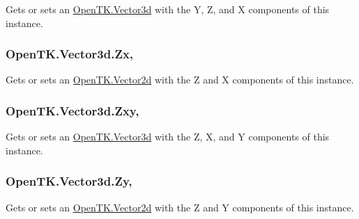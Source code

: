 Gets or sets an \hyperlink{struct_open_t_k_1_1_vector3d}{Open\-T\-K.\-Vector3d} with the Y, Z, and X components of this instance. 

\hypertarget{struct_open_t_k_1_1_vector3d_a80d1ecc7d4722af5295bbacec4d4f47f}{
\subsubsection[{Zx}]{ Open\-T\-K.\-Vector3d.\-Zx\hspace{0.3cm}{\ttfamily [get]}, {\ttfamily [set]}}}\label{struct_open_t_k_1_1_vector3d_a80d1ecc7d4722af5295bbacec4d4f47f}


Gets or sets an \hyperlink{struct_open_t_k_1_1_vector2d}{Open\-T\-K.\-Vector2d} with the Z and X components of this instance. 

\hypertarget{struct_open_t_k_1_1_vector3d_a258be4f58bae23c1e48513647f9f0ad7}{
\subsubsection[{Zxy}]{ Open\-T\-K.\-Vector3d.\-Zxy\hspace{0.3cm}{\ttfamily [get]}, {\ttfamily [set]}}}\label{struct_open_t_k_1_1_vector3d_a258be4f58bae23c1e48513647f9f0ad7}


Gets or sets an \hyperlink{struct_open_t_k_1_1_vector3d}{Open\-T\-K.\-Vector3d} with the Z, X, and Y components of this instance. 

\hypertarget{struct_open_t_k_1_1_vector3d_ad49db3a01526f1557d1b8144d560ccaf}{
\subsubsection[{Zy}]{ Open\-T\-K.\-Vector3d.\-Zy\hspace{0.3cm}{\ttfamily [get]}, {\ttfamily [set]}}}\label{struct_open_t_k_1_1_vector3d_ad49db3a01526f1557d1b8144d560ccaf}


Gets or sets an \hyperlink{struct_open_t_k_1_1_vector2d}{Open\-T\-K.\-Vector2d} with the Z and Y components of this instance. 


